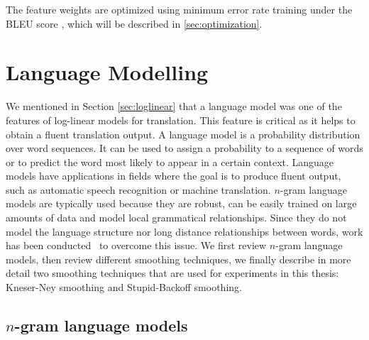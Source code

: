     The feature weights are optimized using minimum error rate training \cite{och:2003:ACL} under the BLEU 
    score \cite{papineni-roukos-ward-zhu:2002:ACL}, which will be described
    in \autoref{sec:optimization}.

\section{Language Modelling}
\label{sec:languageModelling}



We mentioned in Section \ref{sec:loglinear} that a language model was one of the features of
log-linear models for translation. This feature is critical as it helps to obtain a fluent
translation output. A language model is a probability distribution over word sequences. It can be used to assign
a probability to a sequence of words or to predict the word most likely to appear in a certain context.
Language models have applications in fields where the goal is to produce fluent output, such
as automatic speech recognition or machine translation.
$n$-gram language models are typically used because they are 
robust, can be easily trained on large amounts of data and model local grammatical relationships.
Since they do not model the language structure nor long distance relationships between words, work
has been conducted~\citep{shen-xu-weischedel:2008:ACL} to overcome this issue. %
We first review $n$-gram language models, then review different smoothing techniques, we finally
describe in more detail two smoothing techniques
that are used for experiments in this thesis: Kneser-Ney smoothing
and Stupid-Backoff smoothing.

\subsection{$n$-gram language models}
\label{sec:ngramLanguageModels}


